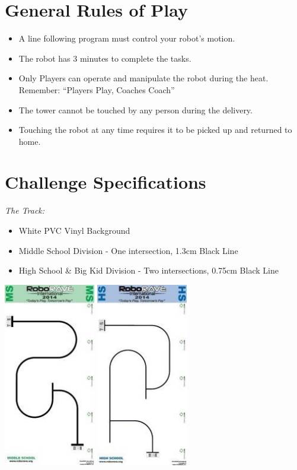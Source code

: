 \documentclass[a4paper,12pt]{article}
\begin{document}
\section{General Rules of Play}
\begin{itemize}
	\item A line following program must control your robot’s motion.
	\item The robot has 3 minutes to complete the tasks.
	\item Only Players can operate and manipulate the robot during the heat. Remember: “Players Play,
	Coaches Coach”
	\item The tower
	cannot be touched by any person during the delivery.
	\item Touching the robot at any time requires it to be picked up and returned to home.
\end{itemize}
\section{Challenge Specifications}

\emph{The Track:}
\begin{itemize}
	\item White PVC Vinyl Background
	\item Middle School Division - One intersection, 1.3cm Black Line
	\item High School & Big Kid Division - Two intersections, 0.75cm Black Line
\end{itemize}
\includegraphics[width=0.3\textwidth]{track_ms_lf.png}
\includegraphics[width=0.3\textwidth]{track_hs_lf.png}
\end{document}
